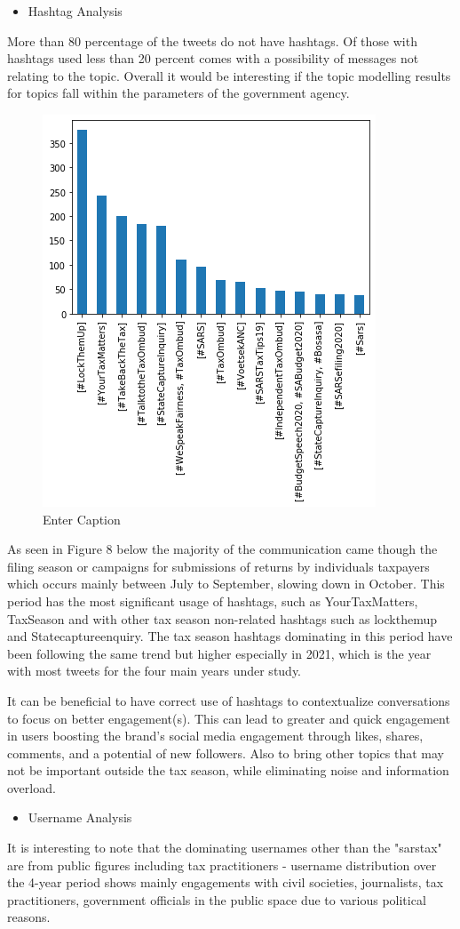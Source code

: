 \begin{itemize}
    \item Hashtag Analysis
\end{itemize}

More than 80 percentage of the tweets do not have hashtags.  Of those with hashtags used less than 20 percent comes with a possibility of messages not relating to the topic. Overall it would be interesting if the topic modelling results for topics fall within the parameters of the  government agency.

\begin{figure}
    \centering
    \includegraphics[width=0.1\linewidth]{Hashtags Used Second Data .png}
    \caption{Enter Caption}
    \label{fig:enter-label}
\end{figure}

As seen in Figure 8 below the majority of the communication came though the filing season or campaigns for submissions of returns by individuals taxpayers which occurs mainly between July to September, slowing down in October. This period has the most significant usage of hashtags, such as YourTaxMatters, TaxSeason and with other tax season non-related hashtags such as lockthemup and Statecaptureenquiry.  The tax season hashtags dominating in this period have been following the same trend but higher especially in 2021, which is the year with most tweets for the four main years under study. 

\cite{alsini2021hashtag} It can be beneficial to have correct use of hashtags to contextualize conversations to focus on better engagement(s).  This can lead to greater and quick engagement in users boosting the brand’s social media engagement through likes, shares, comments, and a potential of new followers. Also to bring other topics that may not be important outside the tax season, while eliminating noise and information overload.

\begin{itemize}
    \item Username Analysis
\end{itemize}

It is interesting to note that the dominating usernames other than the "sarstax" are from public figures including tax practitioners - username distribution over the 4-year period shows mainly engagements with civil societies, journalists, tax practitioners, government officials in the public space due to various political reasons.  

